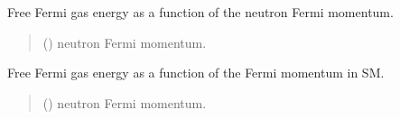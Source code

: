 \documentclass[letterpaper,10pt,english]{sphinxmanual}
\begin{document}

\begin{fulllineitems}
\label{\detokenize{source/api/setup_eos_ffg:nucleardatapy.eos.setup_ffg.effg_NM}}
\pysigstartsignatures
{}
\pysigstopsignatures
\sphinxAtStartPar
Free Fermi gas energy as a function of the neutron Fermi momentum.
\begin{quote}\begin{description}
\sphinxAtStartPar
{} () \textendash{} neutron Fermi momentum.

\end{description}\end{quote}

\end{fulllineitems}


\begin{fulllineitems}
\label{\detokenize{source/api/setup_eos_ffg:nucleardatapy.eos.setup_ffg.effg_SM}}
\pysigstartsignatures
{}
\pysigstopsignatures
\sphinxAtStartPar
Free Fermi gas energy as a function of the Fermi momentum in SM.
\begin{quote}\begin{description}
\sphinxAtStartPar
{} () \textendash{} neutron Fermi momentum.

\end{description}\end{quote}

\end{fulllineitems}
\end{document}
